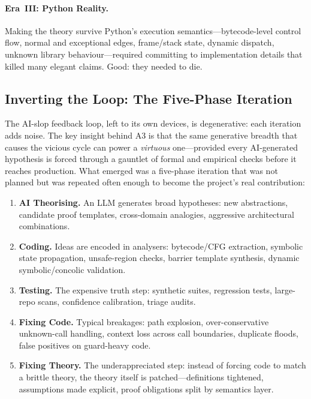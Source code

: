 \documentclass[sigconf,review,anonymous]{acmart}
\begin{document}
\paragraph{Era~III: Python Reality.}
Making the theory survive Python's execution semantics---bytecode-level control flow, normal and exceptional edges, frame/stack state, dynamic dispatch, unknown library behaviour---required committing to implementation details that killed many elegant claims.
Good: they needed to die.

\subsection{Inverting the Loop: The Five-Phase Iteration}

The AI-slop feedback loop, left to its own devices, is degenerative: each iteration adds noise.
The key insight behind \textsc{A3} is that the same generative breadth that causes the vicious cycle can power a \emph{virtuous} one---provided every AI-generated hypothesis is forced through a gauntlet of formal and empirical checks before it reaches production.
What emerged was a five-phase iteration that was not planned but was repeated often enough to become the project's real contribution:

\begin{enumerate}
  \item \textbf{AI Theorising.} An LLM generates broad hypotheses: new abstractions, candidate proof templates, cross-domain analogies, aggressive architectural combinations.
  \item \textbf{Coding.} Ideas are encoded in analysers: bytecode/CFG extraction, symbolic state propagation, unsafe-region checks, barrier template synthesis, dynamic symbolic/concolic validation.
  \item \textbf{Testing.} The expensive truth step: synthetic suites, regression tests, large-repo scans, confidence calibration, triage audits.
  \item \textbf{Fixing Code.} Typical breakages: path explosion, over-conservative unknown-call handling, context loss across call boundaries, duplicate floods, false positives on guard-heavy code.
  \item \textbf{Fixing Theory.} The underappreciated step: instead of forcing code to match a brittle theory, the theory itself is patched---definitions tightened, assumptions made explicit, proof obligations split by semantics layer.
\end{enumerate}
\end{document}
